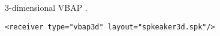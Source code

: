 3-dimensional VBAP \cite{Pulkki1997}.

\begin{lstlisting}[numbers=none]
<receiver type="vbap3d" layout="spkeaker3d.spk"/>
\end{lstlisting}

